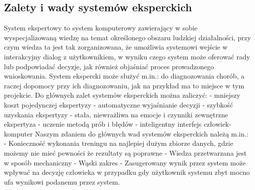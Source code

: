 \documentclass[12pt,a4paper]{article}
\begin{document}
	\subsection*{Zalety i wady systemów eksperckich}
System ekspertowy to system komputerowy zawierający w sobie wyspecjalizowaną  wiedzę  na  temat  określonego obszaru  ludzkiej  działalności,  przy  czym  wiedza ta jest tak zorganizowana, że umożliwia systemowi wejście w interakcyjny dialog z użytkownikiem,  w  wyniku  czego  system  może oferować rady lub podpowiadać decyzje, jak również objaśniać proces prowadzonego wnioskowania. System ekspercki może służyć m.in.: do diagnozowania chorób, a raczej dopomocy przy ich diagnozowaniu, jak na przykład ma to miejsce w tym projekcie.
\newline\newline
Do głównych zalet systemów eksperckich można zaliczyć:\newline
- mniejszy koszt pojedynczej ekspertyzy\newline
- automatyczne wyjaśnianie decyzji\newline
- szybkość uzyskania ekspertyzy\newline
- stała, niewrażliwa na emocje i czynniki zewnętrzne ekspertyza\newline
- uczenie metodą prób i błędów\newline
- inteligentny interfejs człowiek-komputer\newline
\newline\newline
Naszym zdaniem do głównych wad systemów eksperckich należą m.in.:\newline
- Konieczność wykonania treningu na najlepiej dużym zbiorze danych, gdzie możemy nie mieć pewności że rezultaty są poprawne\newline
- Wiedza przetwarzana jest w sposób mechaniczny\newline
- Wąski zakres\newline
- Zasugerowany wynik przez system może wpływać na decyzję człowieka w przypadku gdy użytkownik systemu zbyt mocno ufa wynikowi podanemu przez system.\newline
\end{document}
